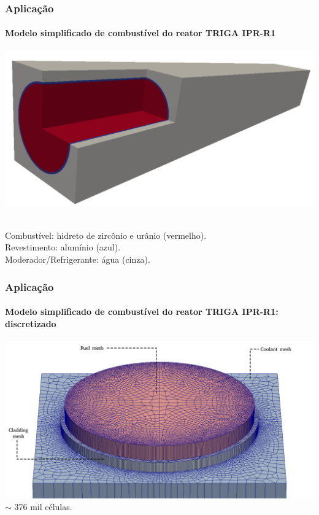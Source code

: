 \documentclass[svgnames,smaller,table]{beamer}
\begin{document}
\begin{frame}
  \frametitle{Aplicação}
  \framesubtitle{Modelo \textbf{simplificado} de combustível do reator TRIGA IPR-R1}
  \centering\includegraphics[scale=0.4]{../figuras/all_regions_isometric.png}
  \vspace{0.2cm}
  \raggedright
  \\
  Combustível: hidreto de zircônio e urânio (vermelho).
  \\
  Revestimento: alumínio (azul).
  \\
  Moderador/Refrigerante: água (cinza).
\end{frame}

\begin{frame}
  \frametitle{Aplicação}
  \framesubtitle{Modelo \textbf{simplificado} de combustível do reator TRIGA IPR-R1: discretizado}
  \centering\includegraphics[scale=0.32]{../figuras/regioes_edges_com_legenda_ingles.png}
  \centering
  \vspace{0.2cm}
  $\sim$ 376 mil células.
\end{frame}
\end{document}
